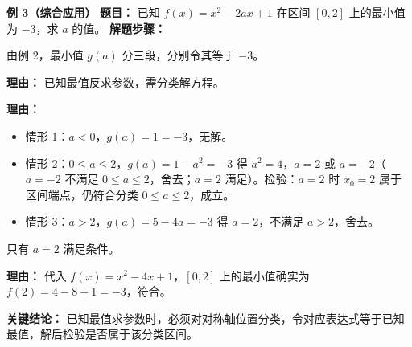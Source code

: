 \begin{examplebox}
	\medskip
	\textbf{\textcolor{CExample}{例 3（综合应用）}}
	\textbf{\textcolor{CExample}{题目：}}
	已知 $f(x)=x^2-2ax+1$ 在区间 $[0,2]$ 上的最小值为 $-3$，求 $a$ 的值。
	\textbf{\textcolor{CExample}{解题步骤：}}
	\begin{description}[style=nextline, leftmargin=2.8em, labelsep=0.5em, itemsep=0.45em]
		\item[\textbf{第一步（设定分类情形）：}]
			由例 2，最小值 $g(a)$ 分三段，分别令其等于 $-3$。
			\par\textbf{理由：} 已知最值反求参数，需分类解方程。
		\item[\textbf{第二步（解方程与检验）：}]
			\par\textbf{理由：}
			\begin{itemize}
			\item 情形 1：$a<0$，$g(a)=1=-3$，无解。
			\item 情形 2：$0\le a\le2$，$g(a)=1-a^2=-3$ 得 $a^2=4$，$a=2$ 或 $a=-2$（$a=-2$ 不满足 $0\le a\le2$，舍去；$a=2$ 满足）。检验：$a=2$ 时 $x_0=2$ 属于区间端点，仍符合分类 $0\le a\le2$，成立。
			\item 情形 3：$a>2$，$g(a)=5-4a=-3$ 得 $a=2$，不满足 $a>2$，舍去。
		\end{itemize}
		\item[\textbf{第三步（确定答案）：}]
			只有 $a=2$ 满足条件。
			\par\textbf{理由：} 代入 $f(x)=x^2-4x+1$，$[0,2]$ 上的最小值确实为 $f(2)=4-8+1=-3$，符合。
	\end{description}
	\textbf{\textcolor{CExample}{关键结论：}}
	已知最值求参数时，必须对对称轴位置分类，令对应表达式等于已知最值，解后检验是否属于该分类区间。
\end{examplebox}
